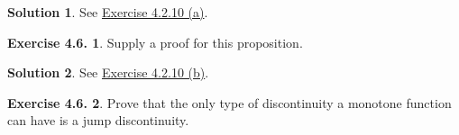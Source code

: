 \documentclass[12pt]{article}
\theoremstyle{definition}
\theoremstyle{exercise}
\newtheorem{exercise}{Exercise 4.6.}
\theoremstyle{solution}
\newtheorem*{solution}{Solution}
\begin{document}
\begin{solution}
    See \href{https://lew98.github.io/Mathematics/UA_Section_4_2_Exercises.pdf}{Exercise 4.2.10 (a)}.
\end{solution}

\begin{exercise}
\label{ex:4}
    Supply a proof for this proposition.
\end{exercise}

\begin{solution}
    See \href{https://lew98.github.io/Mathematics/UA_Section_4_2_Exercises.pdf}{Exercise 4.2.10 (b)}.
\end{solution}

\begin{exercise}
\label{ex:5}
    Prove that the only type of discontinuity a monotone function can have is a jump discontinuity.
\end{exercise}
\end{document}
